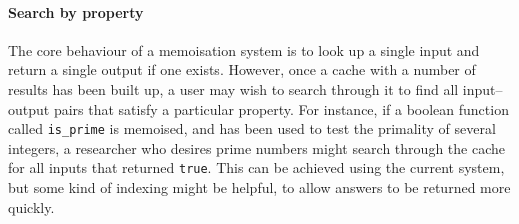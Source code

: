 \documentclass{deliverablereport}
\begin{document}
\paragraph{Search by property}
The core behaviour of a memoisation system is to look up a single input and
return a single output if one exists.  However, once a cache with a number of
results has been built up, a user may wish to search through it to find all
input--output pairs that satisfy a particular property.  For instance, if a
boolean function called \texttt{is\_prime} is memoised, and has been used to
test the primality of several integers, a researcher who desires prime numbers
might search through the cache for all inputs that returned \texttt{true}.  This
can be achieved using the current system, but some kind of indexing might be
helpful, to allow answers to be returned more quickly.
\end{document}
